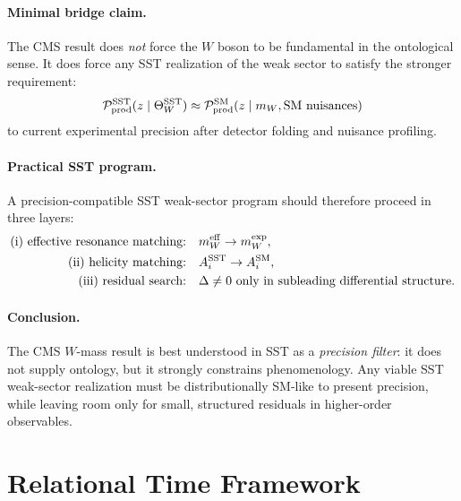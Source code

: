 \documentclass[11pt]{article}
\theoremstyle{definition}
\theoremstyle{plain}
\theoremstyle{remark}
\begin{document}
        \paragraph{Minimal bridge claim.}
            The CMS result does \emph{not} force the $W$ boson to be fundamental in the ontological sense. It does force any SST realization of the weak sector to satisfy the stronger requirement:
            \begin{equation}
                \mathcal{P}_{\rm prod}^{\rm SST}(z\mid \Theta_W^{\rm SST})
                \approx
                \mathcal{P}_{\rm prod}^{\rm SM}(z\mid m_W,\text{SM nuisances})
            \end{equation}
            to current experimental precision after detector folding and nuisance profiling.
    
        \paragraph{Practical SST program.}
            A precision-compatible SST weak-sector program should therefore proceed in three layers:
            \begin{align}
                \text{(i) effective resonance matching:}&\quad
                m_W^{\rm eff} \to m_W^{\rm exp}, \\
                \text{(ii) helicity matching:}&\quad
                A_i^{\rm SST} \to A_i^{\rm SM}, \\
                \text{(iii) residual search:}&\quad
                \Delta \neq 0 \text{ only in subleading differential structure.}
            \end{align}
    
        \paragraph{Conclusion.}
            The CMS $W$-mass result is best understood in SST as a \emph{precision filter}:
            it does not supply ontology, but it strongly constrains phenomenology. Any viable SST weak-sector realization must be distributionally SM-like to present precision, while leaving room only for small, structured residuals in higher-order observables.

    \section{Relational Time Framework}
        \label{sec:time}
\end{document}
